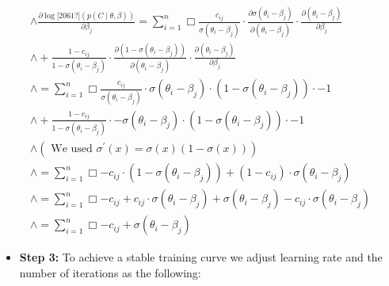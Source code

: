 \documentclass[letterpaper]{article}
\begin{document}
\begin{equation*}
\begin{matrix}\wedge \frac{{\partial}\log \text{[2061?]}(p(C{\mid}\theta ,\beta ))}{{\partial}\beta _j}=\sum
_{i=1}^n\Box \frac{c_{\mathit{ij}}}{\sigma \left(\theta _i-\beta _j\right)}{\cdot}\frac{{\partial}\sigma \left(\theta
_i-\beta _j\right)}{{\partial}\left(\theta _i-\beta _j\right)}{\cdot}\frac{{\partial}\left(\theta _i-\beta
_j\right)}{{\partial}\beta _j}\\\wedge +\frac{1-c_{\mathit{ij}}}{1-\sigma \left(\theta _i-\beta
_j\right)}{\cdot}\frac{{\partial}\left(1-\sigma \left(\theta _i-\beta _j\right)\right)}{{\partial}\left(\theta _i-\beta
_j\right)}{\cdot}\frac{{\partial}\left(\theta _i-\beta _j\right)}{{\partial}\beta _j}\\\wedge =\sum _{i=1}^n\Box
\frac{c_{\mathit{ij}}}{\sigma \left(\theta _i-\beta _j\right)}{\cdot}\sigma \left(\theta _i-\beta
_j\right){\cdot}\left(1-\sigma \left(\theta _i-\beta _j\right)\right){\cdot}-1\\\wedge
+\frac{1-c_{\mathit{ij}}}{1-\sigma \left(\theta _i-\beta _j\right)}{\cdot}-\sigma \left(\theta _i-\beta
_j\right){\cdot}\left(1-\sigma \left(\theta _i-\beta _j\right)\right){\cdot}-1\\\wedge \left(\text{ We used }\sigma
^{'}(x)=\sigma (x)(1-\sigma (x))\right)\\\wedge =\sum _{i=1}^n\Box -c_{\mathit{ij}}{\cdot}\left(1-\sigma \left(\theta
_i-\beta _j\right)\right)+\left(1-c_{\mathit{ij}}\right){\cdot}\sigma \left(\theta _i-\beta _j\right)\\\wedge =\sum
_{i=1}^n\Box -c_{\mathit{ij}}+c_{\mathit{ij}}{\cdot}\sigma \left(\theta _i-\beta _j\right)+\sigma \left(\theta _i-\beta
_j\right)-c_{\mathit{ij}}{\cdot}\sigma \left(\theta _i-\beta _j\right)\\\wedge =\sum _{i=1}^n\Box
-c_{\mathit{ij}}+\sigma \left(\theta _i-\beta _j\right)\end{matrix}
\end{equation*}
\begin{itemize}[resume*=listWWNumii]
\item \textbf{Step 3:} To achieve a stable training curve we adjust learning rate and the number of iterations as the
following:
\end{itemize}

\end{document}
